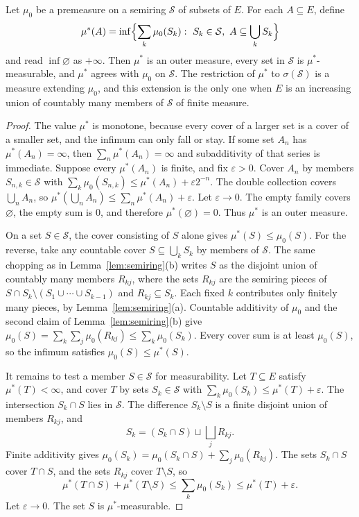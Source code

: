 \begin{theorem}\label{thm:extension}
Let $\mu_0$ be a premeasure on a semiring $\mathcal S$ of subsets of $E$. For each $A\subseteq E$, define
\[\mu^*(A)=\inf\Bigl\{\sum_k\mu_0(S_k):\ S_k\in\mathcal S,\ A\subseteq\bigcup_kS_k\Bigr\}\]
and read $\inf\varnothing$ as $+\infty$. Then $\mu^*$ is an outer measure, every set in $\mathcal S$ is $\mu^*$-measurable, and $\mu^*$ agrees with $\mu_0$ on $\mathcal S$.
The restriction of $\mu^*$ to $\sigma(\mathcal S)$ is a measure extending $\mu_0$, and this extension is the only one when $E$ is an increasing union of countably many members of $\mathcal S$ of finite measure.
\end{theorem}
\begin{proof}
The value $\mu^*$ is monotone, because every cover of a larger set is a cover of a smaller set, and the infimum can only fall or stay.
If some set $A_n$ has $\mu^*(A_n)=\infty$, then $\sum_n\mu^*(A_n)=\infty$ and subadditivity of that series is immediate.
Suppose every $\mu^*(A_n)$ is finite, and fix $\varepsilon>0$.
Cover $A_n$ by members $S_{n,k}\in\mathcal S$ with $\sum_k\mu_0(S_{n,k})\le\mu^*(A_n)+\varepsilon 2^{-n}$.
The double collection covers $\bigcup_n A_n$, so $\mu^*(\bigcup_n A_n)\le\sum_n\mu^*(A_n)+\varepsilon$.
Let $\varepsilon\to0$.
The empty family covers $\varnothing$, the empty sum is $0$, and therefore $\mu^*(\varnothing)=0$.
Thus $\mu^*$ is an outer measure.

On a set $S\in\mathcal S$, the cover consisting of $S$ alone gives $\mu^*(S)\le\mu_0(S)$.
For the reverse, take any countable cover $S\subseteq\bigcup_k S_k$ by members of $\mathcal S$.
The same chopping as in Lemma~\ref{lem:semiring}(b) writes $S$ as the disjoint union of countably many members $R_{kj}$, where the sets $R_{kj}$ are the semiring pieces of $S\cap S_k\setminus(S_1\cup\cdots\cup S_{k-1})$ and $R_{kj}\subseteq S_k$.
Each fixed $k$ contributes only finitely many pieces, by Lemma~\ref{lem:semiring}(a).
Countable additivity of $\mu_0$ and the second claim of Lemma~\ref{lem:semiring}(b) give $\mu_0(S)=\sum_k\sum_j\mu_0(R_{kj})\le\sum_k\mu_0(S_k)$.
Every cover sum is at least $\mu_0(S)$, so the infimum satisfies $\mu_0(S)\le\mu^*(S)$.

It remains to test a member $S\in\mathcal S$ for measurability.
Let $T\subseteq E$ satisfy $\mu^*(T)<\infty$, and cover $T$ by sets $S_k\in\mathcal S$ with $\sum_k\mu_0(S_k)\le\mu^*(T)+\varepsilon$.
The intersection $S_k\cap S$ lies in $\mathcal S$.
The difference $S_k\setminus S$ is a finite disjoint union of members $R_{kj}$, and
\[
S_k=(S_k\cap S)\sqcup\bigsqcup_j R_{kj}.
\]
Finite additivity gives $\mu_0(S_k)=\mu_0(S_k\cap S)+\sum_j\mu_0(R_{kj})$.
The sets $S_k\cap S$ cover $T\cap S$, and the sets $R_{kj}$ cover $T\setminus S$, so
\[\mu^*(T\cap S)+\mu^*(T\setminus S)\le\sum_k\mu_0(S_k)\le\mu^*(T)+\varepsilon.\]
Let $\varepsilon\to0$.
The set $S$ is $\mu^*$-measurable.


\end{proof}
